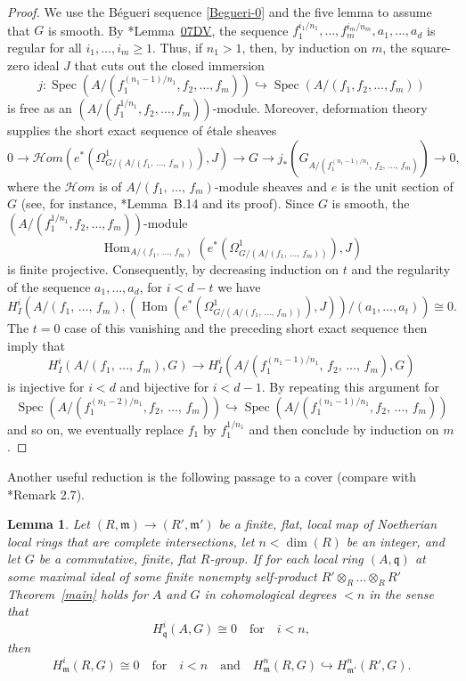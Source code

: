 \documentclass[11pt, reqno]{amsart}
\newcommand{\bZ}{\mathbb{Z}}
\newcommand{\fm}{\mathfrak{m}}
\newcommand{\fq}{\mathfrak{q}}
\newcommand{\sH}{\mathscr{H}}
\DeclareMathOperator{\Hom}{Hom}		%
\DeclareMathOperator{\Spec}{Spec}		%
\newcommand{\ce}{\colonequals}
\newcommand{\hra}{\hookrightarrow}
\providecommand{\p}[1]{\left(#1\right)}
\newcommand{\ra}{\rightarrow}
\newcommand{\tensor}{\otimes} 			%
\providecommand{\uref}[1]{{\upshape\ref{#1}}}
\newcommand{\blem}{\begin{lemma}}
\newcommand{\elem}{\end{lemma}}
\newcommand{\lab}{\label}
\newcommand{\x}{\text}
\providecommand{\qxq}[1]{\quad\text{#1}\quad}
\newcommand{\q}{\quad}
\newcommand{\tst}{\textstyle}
\newcommand{\bpf}{\begin{proof}}
\newcommand{\epf}{\end{proof}}
\numberwithin{equation}{numberingbase}
\theoremstyle{thms}
\newtheorem{lemma}[numberingbase]{Lemma}
\theoremstyle{claims}
\theoremstyle{defs}
\theoremstyle{thms}
\theoremstyle{defs}
\theoremstyle{subsection-tweak}
\theoremstyle{subsection-tweak}
\begin{document}
\bpf
We use the B\'{e}gueri sequence \eqref{Begueri-0} and the five lemma to assume that $G$ is smooth.
By \cite{SP}*{Lemma~\href{https://stacks.math.columbia.edu/tag/07DV}{07DV}}, the sequence $f_1^{i_1/n_1}, \dotsc, f_m^{i_m/n_m}, a_1, \dotsc, a_d$ is regular for all $i_1, \dotsc, i_m \ge 1$. Thus, if $n_1 > 1$, then, by induction on $m$,  the square-zero ideal $J$ that cuts out the closed immersion 
\[
j \colon \Spec(A/(f_1^{(n_1 - 1)/n_1}, f_2, \dotsc, f_m)) \hra \Spec(A/(f_1, f_2, \dotsc, f_m))
\]
is free as an $(A/(f^{1/n_1}_1, f_2, \dotsc, f_m))$-module.
 Moreover, deformation theory supplies the short exact sequence of \'{e}tale sheaves%
\[%
0 \ra \sH om (e^*(\Omega^1_{G/(A/(f_1,\, \dotsc,\, f_m))}), J) \ra G \ra j_*(G_{A/(f^{(n_1 - 1)/n_1}_1,\, f_2,\, \dotsc,\, f_m)}) \ra 0,
\]%
where the $\sH om$ is of $A/(f_1,\, \dotsc,\, f_m )$-module sheaves and $e$ is the unit section of $G$ (see, for instance, \cite{topology-torsors}*{Lemma~B.14 and its proof}). Since $G$ is smooth, the $(A/(f^{1/n_1}_1,  f_2, \dotsc, f_m))$-module 
\[
\Hom_{A/(f_1,\, \dotsc,\, f_m )} (e^*(\Omega^1_{G/(A/(f_1,\, \dotsc,\, f_m))}), J)
\]
is finite projective. Consequently, by decreasing induction on $t$ and the regularity of the sequence $a_1, \dotsc, a_d$, for $i < d - t$ we have
\[
\tst H^i_I\p{A/(f_1,\, \dotsc,\, f_m ), \p{\Hom (e^*(\Omega^1_{G/(A/(f_1,\, \dotsc,\, f_m))}), J)}\!/(a_1, \dotsc, a_t)} \cong 0.
\]
The $t = 0$ case of this vanishing and the preceding short exact sequence then imply that
\[
H^i_I(A/(f_1,\, \dotsc,\, f_m ), G) \ra H^i_I(A/(f^{(n_1 - 1)/n_1}_1,\, f_2,\, \dotsc,\, f_m ), G) 
\]
is injective for $i < d$ and bijective for $i < d - 1$. By repeating this argument for 
\[
\Spec(A/(f^{(n_1 - 2)/n_1}_1, f_2,\, \dotsc,\, f_m)) \hra \Spec(A/(f^{(n_1 - 1)/n_1}_1, f_2,\, \dotsc,\, f_m ))
\]
and so on, we eventually replace $f_1$ by $f_1^{1/n_1}$ and then conclude by induction on $m$.
\epf



Another useful reduction is the following passage to a cover (compare with \cite{brauer-purity}*{Remark 2.7}). %

\blem \lab{finite-cover} 
Let $(R, \fm) \ra (R', \fm')$ be a finite, flat, local map of Noetherian local rings that are %
complete intersections, let $n < \dim(R)$ be an integer, and let $G$ be a commutative, finite, flat $R$-group. If for each local ring $(A, \fq)$ at some maximal ideal of some finite nonempty self-product $R' \tensor_R \dotsc \tensor_R R'$ Theorem~\uref{main} holds for $A$ and $G$ in cohomological degrees $< n$ in the sense that
\[
H^i_\fq(A, G) \cong 0 \qxq{for} i < n, 
\]
then 
\[
H^i_\fm(R, G) \cong 0 \qxq{for} i < n \qxq{and} H^n_\fm(R, G) \hra H^n_{\fm'}(R', G).
\]
\elem
\end{document}
